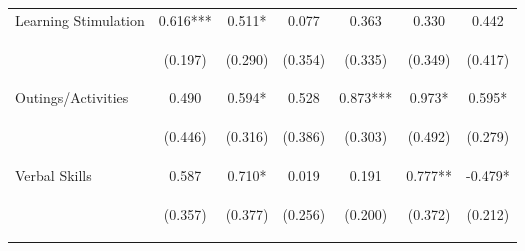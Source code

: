 \begin{tabular}{lcccccc}
\noalign{\smallskip}Learning Stimulation & 0.616*** & 0.511* & 0.077 & 0.363 & 0.330 & 0.442\\
 & \begin{footnotesize}(0.197)\end{footnotesize} & \begin{footnotesize}(0.290)\end{footnotesize} & \begin{footnotesize}(0.354)\end{footnotesize} & \begin{footnotesize}(0.335)\end{footnotesize} & \begin{footnotesize}(0.349)\end{footnotesize} & \begin{footnotesize}(0.417)\end{footnotesize}\\
\noalign{\smallskip}Outings/Activities & 0.490 & 0.594* & 0.528 & 0.873*** & 0.973* & 0.595*\\
 & \begin{footnotesize}(0.446)\end{footnotesize} & \begin{footnotesize}(0.316)\end{footnotesize} & \begin{footnotesize}(0.386)\end{footnotesize} & \begin{footnotesize}(0.303)\end{footnotesize} & \begin{footnotesize}(0.492)\end{footnotesize} & \begin{footnotesize}(0.279)\end{footnotesize}\\
\noalign{\smallskip}Verbal Skills & 0.587 & 0.710* & 0.019 & 0.191 & 0.777** & -0.479*\\
 & \begin{footnotesize}(0.357)\end{footnotesize} & \begin{footnotesize}(0.377)\end{footnotesize} & \begin{footnotesize}(0.256)\end{footnotesize} & \begin{footnotesize}(0.200)\end{footnotesize} & \begin{footnotesize}(0.372)\end{footnotesize} & \begin{footnotesize}(0.212)\end{footnotesize}\\

\end{tabular}
